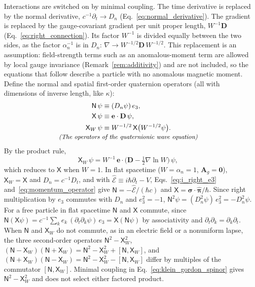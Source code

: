 \documentclass[aps,prd,onecolumn,tightenlines,nofootinbib,notitlepage,11pt,floatfix]{revtex4-2}
\theoremstyle{indentedtheorem}
\begin{document}
Interactions are switched on by minimal coupling. The time derivative is replaced by the normal derivative, $c^{-1}\partial_t \to D_n$ (Eq.~\eqref{eq:normal_derivative}). The gradient is replaced by the gauge-covariant gradient per unit proper length, $W^{-1}\mathbf{D}$ (Eq.~\eqref{eq:right_connection}). Its factor $W^{-1}$ is divided equally between the two sides, as the factor $\alpha_n^{-1}$ is in $D_n$: $\nabla \to W^{-1/2}\mathbf{D}\,W^{-1/2}$. This replacement is an assumption: field-strength terms such as an anomalous-moment term are allowed by local gauge invariance (Remark~\ref{rem:additivity}) and are not included, so the equations that follow describe a particle with no anomalous magnetic moment. Define the normal and spatial first-order quaternion operators (all with dimensions of inverse length, like $\kappa$):
\begin{equation}
    \begin{gathered}
    \begin{aligned}
    \mathsf{N}\,\psi &\equiv (D_n\psi)\,e_3 , \\
    \mathsf{X}\,\psi &\equiv \mathbf{e}\cdot\mathbf{D}\,\psi , \\
    \mathsf{X}_W\,\psi &\equiv W^{-1/2}\,\mathsf{X}\big(W^{-1/2}\psi\big) .
    \end{aligned} \\[-3pt]
    \text{\small\itshape (The operators of the quaternionic wave equation)}
    \end{gathered}
    \label{eq:NX_operators}
\end{equation}
By the product rule,
\begin{equation}
    \mathsf{X}_W\,\psi = W^{-1}\,\mathbf{e}\cdot\big(\mathbf{D}-\tfrac{1}{2}\nabla\ln W\big)\,\psi ,
    \label{eq:X_W}
\end{equation}
which reduces to $\mathsf{X}$ when $W=1$. In flat spacetime ($W=\alpha_n=1$, $\mathbf{A}_g=\mathbf{0}$), $\mathsf{X}_W=\mathsf{X}$ and $D_n = c^{-1}D_t$, and with $\hat{\mathcal{E}} \equiv i\hbar\partial_t - V$, Eqs.~\eqref{eq:i_right_e3} and~\eqref{eq:momentum_operator} give $\mathsf{N} = -\hat{\mathcal{E}}/(\hbar c)$ and $\mathsf{X} = \boldsymbol{\sigma}\cdot\hat{\boldsymbol{\pi}}/\hbar$. Since right multiplication by $e_3$ commutes with $D_n$ and $e_3^2=-1$, $\mathsf{N}^2\psi = (D_n^2\psi)\,e_3^2 = -D_n^2\psi$. For a free particle in flat spacetime $\mathsf{N}$ and $\mathsf{X}$ commute, since $\mathsf{N}(\mathsf{X}\psi)=c^{-1}\sum_k e_k\,(\partial_t\partial_k\psi)\,e_3=\mathsf{X}(\mathsf{N}\psi)$ by associativity and $\partial_t\partial_k=\partial_k\partial_t$. When $\mathsf{N}$ and $\mathsf{X}_W$ do not commute, as in an electric field or a nonuniform lapse, the three second-order operators $\mathsf{N}^2-\mathsf{X}_W^2$, $(\mathsf{N}-\mathsf{X}_W)(\mathsf{N}+\mathsf{X}_W) = \mathsf{N}^2-\mathsf{X}_W^2+[\mathsf{N},\mathsf{X}_W]$, and $(\mathsf{N}+\mathsf{X}_W)(\mathsf{N}-\mathsf{X}_W) = \mathsf{N}^2-\mathsf{X}_W^2-[\mathsf{N},\mathsf{X}_W]$ differ by multiples of the commutator $[\mathsf{N},\mathsf{X}_W]$. Minimal coupling in Eq.~\eqref{eq:klein_gordon_spinor} gives $\mathsf{N}^2-\mathsf{X}_W^2$ and does not select either factored product.
\end{document}

